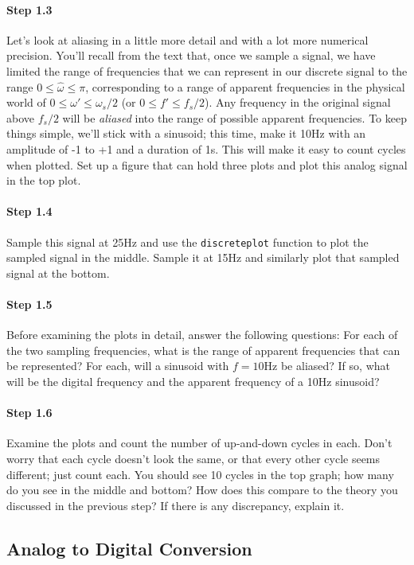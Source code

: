 \paragraph{Step 1.3} Let's look at aliasing in a little more detail
and with a lot more numerical precision. You'll recall from the text
that, once we sample a signal, we have limited the range of
frequencies that we can represent in our discrete signal to the range
$0 \leq \hat{\omega} \leq \pi$, corresponding to a range of apparent
frequencies in the physical world of $0 \leq \omega' \leq \omega_s/2$
(or $0 \leq f' \leq f_s/2$). Any frequency in the original signal
above $f_s/2$ will be \emph{aliased} into the range of possible
apparent frequencies. To keep things simple, we'll stick with a
sinusoid; this time, make it 10Hz with an amplitude of -1 to +1 and a
duration of 1s. This will make it easy to count cycles when
plotted. Set up a figure that can hold three plots and plot this
analog signal in the top plot.

\paragraph{Step 1.4} Sample this signal at 25Hz and use the
\texttt{discreteplot} function to plot the sampled signal in the
middle. Sample it at 15Hz and similarly plot that sampled signal at
the bottom.

\paragraph{Step 1.5} Before examining the plots in detail, answer the
following questions: For each of the two sampling frequencies, what is
the range of apparent frequencies that can be represented? For each,
will a sinusoid with $f = 10$Hz be aliased? If so, what will be the
digital frequency and the apparent frequency of a 10Hz sinusoid?

\paragraph{Step 1.6} Examine the plots and count the number of
up-and-down cycles in each. Don't worry that each cycle doesn't look
the same, or that every other cycle seems different; just count
each. You should see 10 cycles in the top graph; how many do you see
in the middle and bottom? How does this compare to the theory you
discussed in the previous step? If there is any discrepancy, explain it.


\subsection{Analog to Digital Conversion}

